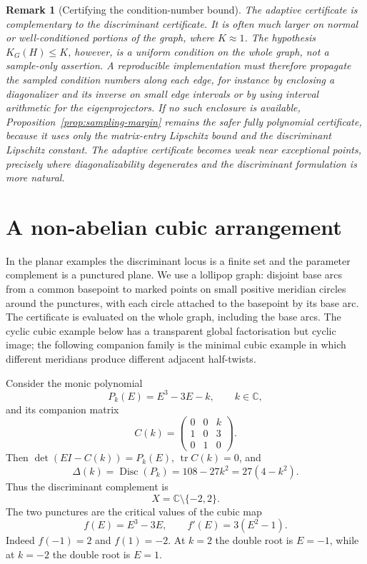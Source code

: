 \documentclass[11pt]{article}
\newtheorem{remark}[theorem]{Remark}
\numberwithin{equation}{section}
\DeclareMathOperator{\Disc}{Disc}
\DeclareMathOperator{\tr}{tr}
\newcommand{\bbC}{\mathbb C}
\begin{document}
\begin{remark}[Certifying the condition-number bound]
The adaptive certificate is complementary to the discriminant certificate.
It is often much larger on normal or well-conditioned portions of the graph,
where \(K\approx1\).  The hypothesis \(K_G(H)\le K\), however, is a uniform
condition on the whole graph, not a sample-only assertion.  A reproducible
implementation must therefore propagate the sampled condition numbers along
each edge, for instance by enclosing a diagonalizer and its inverse on small
edge intervals or by using interval arithmetic for the eigenprojectors.  If
no such enclosure is available, Proposition~\ref{prop:sampling-margin}
remains the safer fully polynomial certificate, because it uses only the
matrix-entry Lipschitz bound and the discriminant Lipschitz constant.  The
adaptive certificate becomes weak near exceptional points, precisely where
diagonalizability degenerates and the discriminant formulation is more
natural.
\end{remark}

\section{A non-abelian cubic arrangement}\label{sec:nonabelian-cubic}

In the planar examples the discriminant locus is a finite set and the
parameter complement is a punctured plane.  We use a lollipop graph: disjoint
base arcs from a common basepoint to marked points on small positive meridian
circles around the punctures, with each circle attached to the basepoint by its
base arc.  The certificate is evaluated on the whole graph, including the
base arcs.  The cyclic cubic example below has a transparent global
factorisation but cyclic image; the following companion family is the minimal
cubic example in which different meridians produce different adjacent
half-twists.

Consider the monic polynomial
\[
  P_k(E)=E^3-3E-k,
  \qquad k\in\bbC,
\]
and its companion matrix
\[
  C(k)=
  \begin{pmatrix}
  0&0&k\\
  1&0&3\\
  0&1&0
  \end{pmatrix}.
\]
Then \(\det(EI-C(k))=P_k(E)\), \(\tr C(k)=0\), and
\[
  \Delta(k)=\Disc(P_k)=108-27k^2=27(4-k^2).
\]
Thus the discriminant complement is
\[
  X=\bbC\setminus\{-2,2\}.
\]
The two punctures are the critical values of the cubic map
\[
  f(E)=E^3-3E,
  \qquad f'(E)=3(E^2-1).
\]
Indeed \(f(-1)=2\) and \(f(1)=-2\).  At \(k=2\) the double root is
\(E=-1\), while at \(k=-2\) the double root is \(E=1\).
\end{document}
